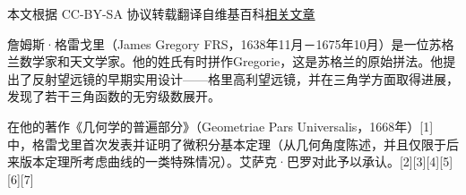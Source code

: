 
本文根据 CC-BY-SA 协议转载翻译自维基百科\href{https://en.wikipedia.org/wiki/James_Gregory_(mathematician)}{相关文章}

詹姆斯·格雷戈里（James Gregory FRS，1638年11月－1675年10月）是一位苏格兰数学家和天文学家。他的姓氏有时拼作Gregorie，这是苏格兰的原始拼法。他提出了反射望远镜的早期实用设计——格里高利望远镜，并在三角学方面取得进展，发现了若干三角函数的无穷级数展开。

在他的著作《几何学的普遍部分》（Geometriae Pars Universalis，1668年）[1] 中，格雷戈里首次发表并证明了微积分基本定理（从几何角度陈述，并且仅限于后来版本定理所考虑曲线的一类特殊情况）。艾萨克·巴罗对此予以承认。[2][3][4][5][6][7]
